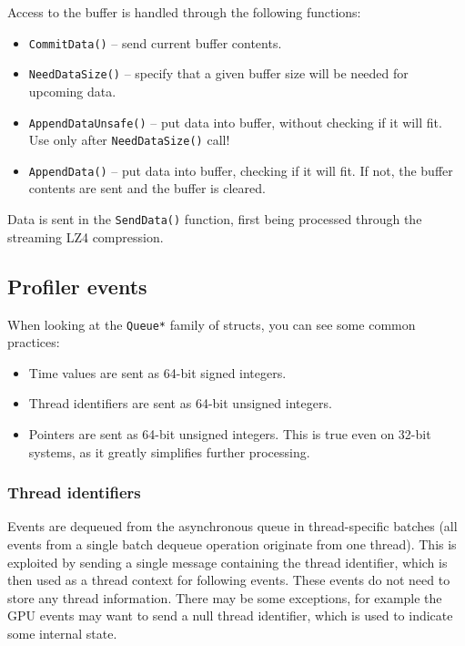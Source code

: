 \documentclass[hidelinks,titlepage,a4paper]{article}
\begin{document}
Access to the buffer is handled through the following functions:

\begin{itemize}
\item \texttt{CommitData()} -- send current buffer contents.
\item \texttt{NeedDataSize()} -- specify that a given buffer size will be needed for upcoming data.
\item \texttt{AppendDataUnsafe()} -- put data into buffer, without checking if it will fit. Use only after \texttt{NeedDataSize()} call!
\item \texttt{AppendData()} -- put data into buffer, checking if it will fit. If not, the buffer contents are sent and the buffer is cleared.
\end{itemize}

Data is sent in the \texttt{SendData()} function, first being processed through the streaming LZ4 compression.

\subsection{Profiler events}
\label{profilerevents}

When looking at the \texttt{Queue*} family of structs, you can see some common practices:

\begin{itemize}
\item Time values are sent as 64-bit signed integers.
\item Thread identifiers are sent as 64-bit unsigned integers.
\item Pointers are sent as 64-bit unsigned integers. This is true even on 32-bit systems, as it greatly simplifies further processing.
\end{itemize}

\subsubsection{Thread identifiers}

Events are dequeued from the asynchronous queue in thread-specific batches (all events from a single batch dequeue operation originate from one thread). This is exploited by sending a single message containing the thread identifier, which is then used as a thread context for following events. These events do not need to store any thread information. There may be some exceptions, for example the GPU events may want to send a null thread identifier, which is used to indicate some internal state.
\end{document}
